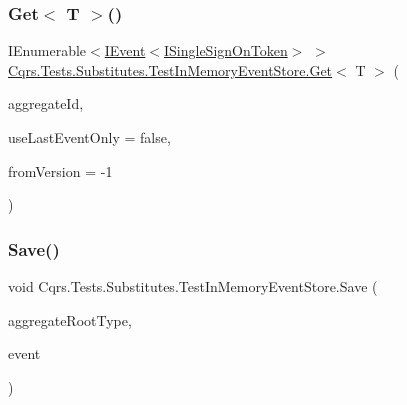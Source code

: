 \mbox{\label{classCqrs_1_1Tests_1_1Substitutes_1_1TestInMemoryEventStore_a6fe1ca9d8bcd3f29401457340139af11_a6fe1ca9d8bcd3f29401457340139af11}} 
\subsubsection{\texorpdfstring{Get$<$ T $>$()}{Get< T >()}}
{\footnotesize\ttfamily I\+Enumerable$<$\hyperlink{interfaceCqrs_1_1Events_1_1IEvent}{I\+Event}$<$\hyperlink{interfaceCqrs_1_1Authentication_1_1ISingleSignOnToken}{I\+Single\+Sign\+On\+Token}$>$ $>$ \hyperlink{classCqrs_1_1Tests_1_1Substitutes_1_1TestInMemoryEventStore_a45873558fbc3bc5eb1766ffc6fbead88_a45873558fbc3bc5eb1766ffc6fbead88}{Cqrs.\+Tests.\+Substitutes.\+Test\+In\+Memory\+Event\+Store.\+Get}$<$ T $>$ (\begin{DoxyParamCaption}\item[{Guid}]{aggregate\+Id,  }\item[{bool}]{use\+Last\+Event\+Only = {\ttfamily false},  }\item[{int}]{from\+Version = {\ttfamily -\/1} }\end{DoxyParamCaption})}

\mbox{\label{classCqrs_1_1Tests_1_1Substitutes_1_1TestInMemoryEventStore_ad55933a4b148cef3d59c5552038af878_ad55933a4b148cef3d59c5552038af878}} 
\subsubsection{\texorpdfstring{Save()}{Save()}}
{\footnotesize\ttfamily void Cqrs.\+Tests.\+Substitutes.\+Test\+In\+Memory\+Event\+Store.\+Save (\begin{DoxyParamCaption}\item[{Type}]{aggregate\+Root\+Type,  }\item[{\hyperlink{interfaceCqrs_1_1Events_1_1IEvent}{I\+Event}$<$ \hyperlink{interfaceCqrs_1_1Authentication_1_1ISingleSignOnToken}{I\+Single\+Sign\+On\+Token} $>$ @}]{event }\end{DoxyParamCaption})}

